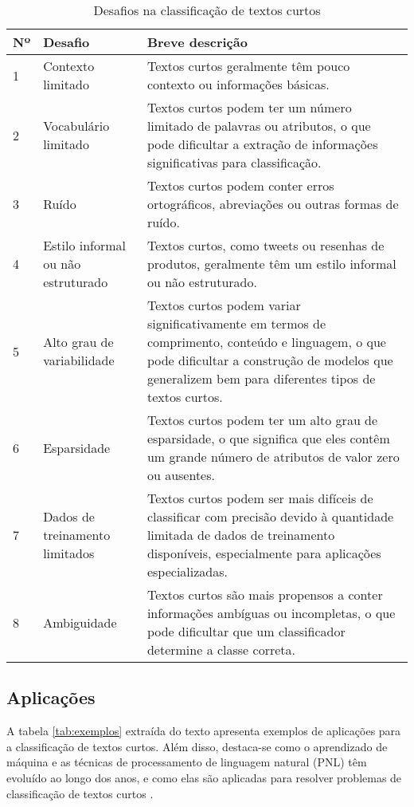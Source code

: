\begin{table}[h!]
\centering
\begin{tabular}{l|p{4cm}|p{8cm}}
\hline
\textbf{Nº} & \centering\textbf{Desafio} & \textbf{Breve descrição} \\
\hline
1 & \centering Contexto limitado & Textos curtos geralmente têm pouco contexto ou informações básicas. \\
\hline
2 & \centering Vocabulário limitado & Textos curtos podem ter um número limitado de palavras ou atributos, o que pode dificultar a extração de informações significativas para classificação. \\
\hline
3 & \centering Ruído & Textos curtos podem conter erros ortográficos, abreviações ou outras formas de ruído. \\
\hline
4 & \centering Estilo informal ou não estruturado & Textos curtos, como tweets ou resenhas de produtos, geralmente têm um estilo informal ou não estruturado. \\
\hline
5 & \centering Alto grau de variabilidade & Textos curtos podem variar significativamente em termos de comprimento, conteúdo e linguagem, o que pode dificultar a construção de modelos que generalizem bem para diferentes tipos de textos curtos. \\
\hline
6 & \centering Esparsidade & Textos curtos podem ter um alto grau de esparsidade, o que significa que eles contêm um grande número de atributos de valor zero ou ausentes. \\
\hline
7 & \centering Dados de treinamento limitados & Textos curtos podem ser mais difíceis de classificar com precisão devido à quantidade limitada de dados de treinamento disponíveis, especialmente para aplicações especializadas. \\
\hline
8 & \centering Ambiguidade & Textos curtos são mais propensos a conter informações ambíguas ou incompletas, o que pode dificultar que um classificador determine a classe correta. \\
\hline
\end{tabular}
\caption{Desafios na classificação de textos curtos}
\label{tab:desafios_textos_curtos}
\end{table}


\subsection{Aplicações}

A tabela \ref{tab:exemplos} extraída do texto \cite{bhavani2021review} apresenta exemplos de aplicações para a classificação de textos curtos. Além disso, destaca-se como o aprendizado de máquina e as técnicas de processamento de linguagem natural (PNL) têm evoluído ao longo dos anos, e como elas são aplicadas para resolver problemas de classificação de textos curtos \cite{alsmadi2019review}.  %


